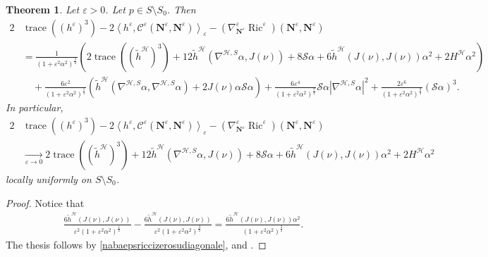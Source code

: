 \documentclass[11pt]{amsart}
\newcommand{\hhh}{{\mathcal{H}}}
\newcommand{\n}[1]{\nabla^\varepsilon_{ #1 }}
\newcommand{\vh}{\nu}
\newcommand{\eps}{\varepsilon}
\newcommand{\s}{\mathcal S}
\renewcommand{\j}{\mathcal{C}}
\renewcommand{\n}{\mathbf{N}}
\DeclareMathOperator{\ric}{Ric}
\DeclareMathOperator{\trace}{trace}
\newtheorem{theorem}{Theorem}[section]
\theoremstyle{definition}
\theoremstyle{remark}
\numberwithin{equation}{section}
\begin{document}
    \begin{theorem}
        Let $\eps>0$. Let $p\in S\setminus S_0$. 
        Then
        \begin{equation*}
            \begin{split}
                2&\trace\left(\left(h^\eps\right)^3\right)-2 \left\langle h^\eps,\j^\eps(\n^\eps,\n^\eps)\right\rangle_\eps-\left(\nabla^\eps_{\n^\eps}\ric^\eps\right)(\n^\eps,\n^\eps)\\
                &=\frac{1}{\left(1+\eps^2\alpha^2\right)^\frac{3}{2}}\left(2\trace\left(\left(\tilde h^\hhh\right)^3\right)+12\tilde h^\hhh\left(\nabla^{\hhh,S}\alpha,J(\vh)\right)+8\s\alpha+6\tilde h^\hhh(J(\vh),J(\vh))\alpha^2+2 H^\hhh\alpha^2\right)\\
                &\quad +\frac{6\eps^2}{\left(1+\eps^2\alpha^2\right)^\frac{5}{2}}\left(\tilde h^\hhh\left(\nabla^{\hhh,S}\alpha,\nabla^{\hhh,S}\alpha\right)+2J(\vh)\alpha\s\alpha\right)+\frac{6\eps^4}{\left(1+\eps^2\alpha^2\right)^\frac{7}{2}}\s\alpha\left|\nabla^{\hhh,S}\alpha\right|^2+\frac{2\eps^6}{\left(1+\eps^2\alpha^2\right)^\frac{9}{2}}\left(\s\alpha\right)^3.
            \end{split}
        \end{equation*}
        In particular,
        \begin{equation}\label{qbqequation}
            \begin{split}
              2&\trace\left(\left(h^\eps\right)^3\right)-2 \left\langle h^\eps,\j^\eps(\n^\eps,\n^\eps)\right\rangle_\eps-\left(\nabla^\eps_{\n^\eps}\ric^\eps\right)(\n^\eps,\n^\eps)\\
                &\xrightarrow[\eps\to 0]{}  2\trace\left(\left(\tilde h^\hhh\right)^3\right)+12\tilde h^\hhh\left(\nabla^{\hhh,S}\alpha,J(\vh)\right)+8\s\alpha+6\tilde h^\hhh(J(\vh),J(\vh))\alpha^2+2 H^\hhh\alpha^2
            \end{split}
        \end{equation}
        locally uniformly on $S\setminus S_0$.
    \end{theorem}
    \begin{proof}
    Notice that
    \begin{equation*}
        \begin{split}
            \frac{6\tilde h^\hhh(J(\vh),J(\vh))}{\eps^2\left(1+\eps^2\alpha^2\right)^\frac{1}{2}}-\frac{6\tilde h^\hhh(J(\vh),J(\vh))}{\eps^2\left(1+\eps^2\alpha^2\right)^\frac{3}{2}}=\frac{6\tilde h^\hhh(J(\vh),J(\vh))\alpha^2}{\left(1+\eps^2\alpha^2\right)^\frac{3}{2}}.
        \end{split}
    \end{equation*}
        The thesis follows by \eqref{nabaepsriccizerosudiagonale},  and .
    \end{proof}
\end{document}
